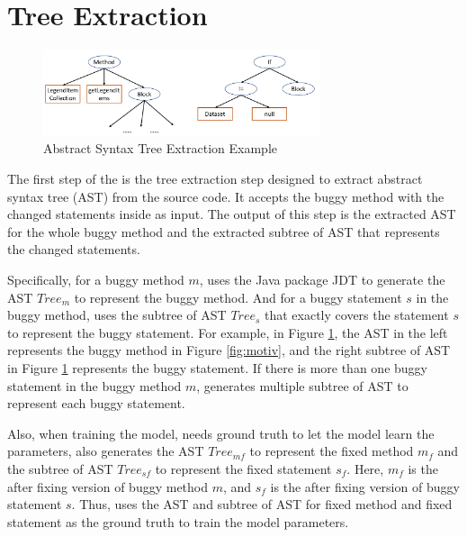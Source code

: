 \section{Tree Extraction}

\begin{figure}[t]
	\centering
	\includegraphics[width=3.2in]{graphs/tree_extraction.png}
	\caption{Abstract Syntax Tree Extraction Example}
	\label{tree-extraction}
\end{figure}


The first step of the \tool is the tree extraction step designed to extract abstract syntax tree (AST) from the source code. It accepts the buggy method with the changed statements inside as input. The output of this step is the extracted AST for the whole buggy method and the extracted subtree of AST that represents the changed statements.

Specifically, for a buggy method $m$, \tool uses the Java package JDT \cite{JDT} to generate the AST $Tree_m$ to represent the buggy method. And for a buggy statement $s$ in the buggy method, \tool uses the subtree of AST $Tree_s$ that exactly covers the statement $s$ to represent the buggy statement. For example, in Figure \ref{tree-extraction}, the AST in the left represents the buggy method in Figure \ref{fig:motiv}, and the right subtree of AST in Figure \ref{tree-extraction} represents the buggy statement. If there is more than one buggy statement in the buggy method $m$, \tool generates multiple subtree of AST to represent each buggy statement.

Also, when training the model, \tool needs ground truth to let the model learn the parameters, \tool also generates the AST $Tree_{mf}$ to represent the fixed method $m_f$ and the subtree of AST $Tree_{sf}$ to represent the fixed statement $s_f$. Here, $m_f$ is the after fixing version of buggy method $m$, and $s_f$ is the after fixing version of buggy statement $s$. Thus, \tool uses the AST and subtree of AST for fixed method and fixed statement as the ground truth to train the model parameters.

